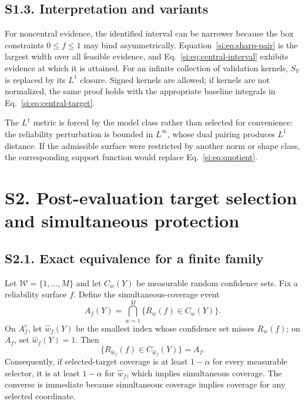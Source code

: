 \documentclass[10pt,twocolumn]{article}
\begin{document}
\subsection*{S1.3. Interpretation and variants}

For noncentral evidence, the identified interval can be narrower because the box constraints $0\le f\le1$ may bind asymmetrically. Equation~\ref{si:eq:sharp-pair} is the largest width over all feasible evidence, and Eq.~\ref{si:eq:central-interval} exhibits evidence at which it is attained. For an infinite collection of validation kernels, $S_V$ is replaced by its $L^1$ closure. Signed kernels are allowed; if kernels are not normalized, the same proof holds with the appropriate baseline integrals in Eq.~\ref{si:eq:central-target}.

The $L^1$ metric is forced by the model class rather than selected for convenience: the reliability perturbation is bounded in $L^\infty$, whose dual pairing produces $L^1$ distance. If the admissible surface were restricted by another norm or shape class, the corresponding support function would replace Eq.~\ref{si:eq:quotient}.

\section*{S2. Post-evaluation target selection and simultaneous protection}

\subsection*{S2.1. Exact equivalence for a finite family}

Let $\mathcal W=\{1,\ldots,M\}$ and let $C_w(Y)$ be measurable random confidence sets. Fix a reliability surface $f$. Define the simultaneous-coverage event
\begin{equation}
A_f(Y)=\bigcap_{w=1}^M\{R_w(f)\in C_w(Y)\}.
\label{si:eq:allcoverage}
\end{equation}
On $A_f^c$, let $\widehat w_f(Y)$ be the smallest index whose confidence set misses $R_w(f)$; on $A_f$, set $\widehat w_f(Y)=1$. Then
\begin{equation}
\{R_{\widehat w_f}(f)\in C_{\widehat w_f}(Y)\}=A_f.
\label{si:eq:firstfailure}
\end{equation}
Consequently, if selected-target coverage is at least $1-\alpha$ for every measurable selector, it is at least $1-\alpha$ for $\widehat w_f$, which implies simultaneous coverage. The converse is immediate because simultaneous coverage implies coverage for any selected coordinate.
\end{document}
